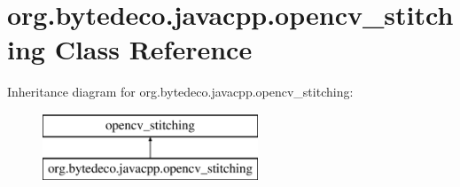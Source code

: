 \hypertarget{classorg_1_1bytedeco_1_1javacpp_1_1opencv__stitching}{}\section{org.\+bytedeco.\+javacpp.\+opencv\+\_\+stitching Class Reference}
\label{classorg_1_1bytedeco_1_1javacpp_1_1opencv__stitching}
Inheritance diagram for org.\+bytedeco.\+javacpp.\+opencv\+\_\+stitching\+:\begin{figure}[H]
\begin{center}
\leavevmode
\includegraphics[height=2.000000cm]{classorg_1_1bytedeco_1_1javacpp_1_1opencv__stitching}
\end{center}
\end{figure}
